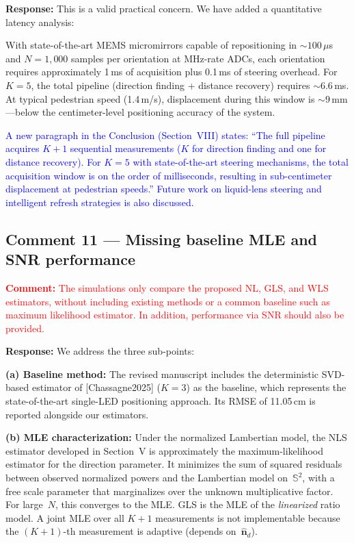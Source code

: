 \documentclass[11pt]{article}
\newcommand{\reviewercomment}[1]{\noindent\textcolor{red}{\textbf{Comment:} #1}\par\vspace{6pt}}
\newcommand{\response}{\noindent\textbf{Response:} }
\newcommand{\change}[1]{\textcolor{blue}{#1}}
\begin{document}
\response This is a valid practical concern. We have added a quantitative latency analysis:

With state-of-the-art MEMS micromirrors capable of repositioning in ${\sim}100\,\mu$s and $N=1{,}000$ samples per orientation at MHz-rate ADCs, each orientation requires approximately 1\,ms of acquisition plus 0.1\,ms of steering overhead. For $K=5$, the total pipeline (direction finding + distance recovery) requires ${\sim}6.6$\,ms. At typical pedestrian speed (1.4\,m/s), displacement during this window is ${\sim}9$\,mm---below the centimeter-level positioning accuracy of the system.

\change{A new paragraph in the Conclusion (Section~VIII) states: ``The full pipeline acquires $K+1$ sequential measurements ($K$ for direction finding and one for distance recovery). For $K=5$ with state-of-the-art steering mechanisms, the total acquisition window is on the order of milliseconds, resulting in sub-centimeter displacement at pedestrian speeds.'' Future work on liquid-lens steering and intelligent refresh strategies is also discussed.}

\subsection{Comment 11 --- Missing baseline MLE and SNR performance}

\reviewercomment{The simulations only compare the proposed NL, GLS, and WLS estimators, without including existing methods or a common baseline such as maximum likelihood estimator. In addition, performance via SNR should also be provided.}

\response We address the three sub-points:

\textbf{(a) Baseline method:} The revised manuscript includes the deterministic SVD-based estimator of [Chassagne2025] ($K=3$) as the baseline, which represents the state-of-the-art single-LED positioning approach. Its RMSE of 11.05\,cm is reported alongside our estimators.

\textbf{(b) MLE characterization:} Under the normalized Lambertian model, the NLS estimator developed in Section~V is approximately the maximum-likelihood estimator for the direction parameter. It minimizes the sum of squared residuals between observed normalized powers and the Lambertian model on~$\mathbb{S}^2$, with a free scale parameter that marginalizes over the unknown multiplicative factor. For large~$N$, this converges to the MLE. GLS is the MLE of the \emph{linearized} ratio model. A joint MLE over all $K+1$ measurements is not implementable because the $(K+1)$-th measurement is adaptive (depends on~$\hat{\mathbf{n}}_d$).
\end{document}
